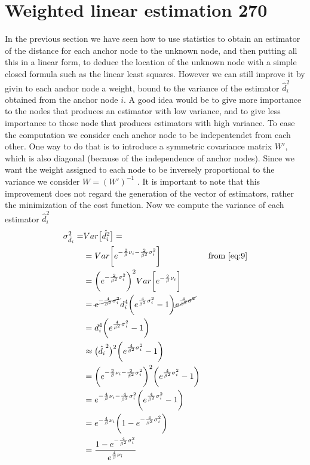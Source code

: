 \documentclass[12pt,twoside]{report}
\begin{document}
\section{Weighted linear estimation 270}
In the previous section we have seen how to use statistics to obtain an estimator of the distance for each anchor node to the unknown node, and then putting all this in a linear form, to deduce the location of the unknown node with a simple closed formula such as the linear least squares. However we can still improve it by givin to each anchor node a weight, bound to the variance of the estimator $\hat{d}_i^2$ obtained from the anchor node $i$. A good idea would be to give more importance to the nodes that produces an estimator with low variance, and to give less importance to those node that produces estimators with high variance. To ease the computation we consider each anchor node to be indepentendet from each other. One way to do that is to introduce a symmetric covariance matrix $W'$, which is also diagonal (because of the independence of anchor nodes). Since we want the weight assigned to each node to be inversely proportional to the variance we consider $W=(W')^{-1}$ \cite{rzk,899498y4hd}. It is important to note that this improvement does not regard the generation of the vector of estimators, rather the minimization of the cost function. Now we compute the variance of each estimator $\hat{d}_i^2$
\begin{align}
\sigma^2_{\hat{d_i}}=&Var\big[\hat{d_i^2}\big]=&& \\
&=Var\bigg[e^{-\frac{2}{\beta}\nu_i-\frac{2}{\beta^2}\sigma^2_i}\bigg] && \text{from \ref{eq:9}}\\
&=\bigg(e^{-\frac{2}{\beta^2}\sigma^2_i}\bigg)^2Var\bigg[e^{-\frac{2}{\beta}\nu_i}\bigg]\\
&=\cancel{e^{-\frac{4}{\beta^2}\sigma^2_i}}d_i^4\bigg(e^{\frac{4}{\beta^2}\sigma_i^2}-1\bigg)\cancel{e^{\frac{4}{\beta^2}\sigma^2}}\\
&=d_i^4\bigg(e^{\frac{4}{\beta^2}\sigma_i^2}-1\bigg)\\
&\approx \big(\hat{d_i}^2\big)^2\bigg(e^{\frac{4}{\beta^2}\sigma_i^2}-1\bigg)\\
&=\bigg(e^{-\frac{2}{\beta}\nu_i-\frac{2}{\beta^2}\sigma^2_i}\bigg)^2\bigg(e^{\frac{4}{\beta^2}\sigma_i^2}-1\bigg)\\
&=e^{-\frac{4}{\beta}\nu_i-\frac{4}{\beta^2}\sigma^2_i}\bigg(e^{\frac{4}{\beta^2}\sigma^2_i}-1\bigg)\\
&=e^{-\frac{4}{\beta}\nu_i}\bigg(1-e^{-\frac{4}{\beta^2}\sigma^2_i}\bigg)\\
&=\frac{1-e^{-\frac{4}{\beta^2}\sigma^2_i}}{e^{\frac{4}{\beta}\nu_i}}
\end{align}
\end{document}
